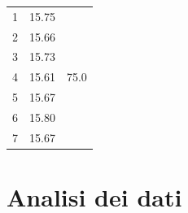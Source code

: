 \documentclass{article}
\begin{document}
\begin{table}[h!]
\begin{minipage}{0.1\textwidth}
\begin{tabular}{ | r | c | c | }
    				\hline
    				1 & 15.75 & \multirow{7}{*}{75.0} \\ \cline{1-2}
    				2 & 15.66 & \\ \cline{1-2}
    				3 & 15.73 & \\ \cline{1-2}
    				4 & 15.61 & \\ \cline{1-2}
    				5 & 15.67 & \\ \cline{1-2}
    				6 & 15.80 & \\ \cline{1-2}
    				7 & 15.67 & \\ \cline{1-2}
    				\hline
			\end{tabular}
	\end{minipage}
\end{table}
\section{Analisi dei dati}
\end{document}
